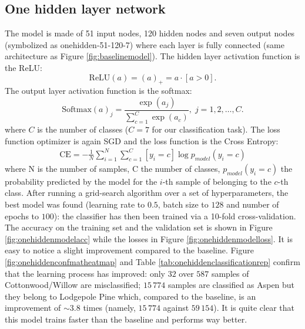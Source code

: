 \subsection{One hidden layer network}
\label{sec:onehidden}
The model is made of 51 input nodes, 120 hidden nodes and seven output nodes (symbolized as onehidden-51-120-7) where each layer is fully connected (same architecture as Figure \ref{fig:baselinemodel}). The hidden layer activation function is the ReLU:
\begin{equation}
\text{ReLU}(a) = (a)_+ = a\cdot[a>0].
\end{equation}
The output layer activation function is the softmax:
\begin{equation}
\text{Softmax}(a)_j = \frac{\exp(a_j)}{\sum_{c=1}^{C} \exp(a_c)}, \; j = 1,2,\dots,C.
\end{equation}
where $C$ is the number of classes ($C=7$ for our classification task). The loss function optimizer is again SGD and the loss function is the Cross Entropy:
\begin{equation}
\begin{aligned}
\text{CE} = - \frac{1}{N} \sum_{i=1}^{N}\sum_{c=1}^{C} [y_i = c] \log p_{model}(y_i = c)
\end{aligned}
\end{equation}
where N is the number of samples, C the number of classes, $p_{model}(y_i = c)$ the probability predicted by the model for the $i$-th sample of belonging to the $c$-th class. After running a grid-search algorithm over a set of hyperparameters, the best model was found (learning rate to $0.5$, batch size to $128$ and number of epochs to $100$): the classifier has then been trained via a 10-fold cross-validation. The accuracy on the training set and the validation set is shown in Figure \ref{fig:onehiddenmodelacc} while the losses in Figure \ref{fig:onehiddenmodelloss}. It is easy to notice a slight improvement compared to the baseline. Figure \ref{fig:onehiddenconfmatheatmap} and Table \ref{tab:onehiddenclassificationrep} confirm that the learning process has improved: only $32$ over $587$ samples of Cottonwood/Willow are misclassified; $15\,774$ samples are classified as Aspen but they belong to Lodgepole Pine which, compared to the baseline, is an improvement of $\sim3.8$ times (namely, $15\,774$ against $59\,154$). It is quite clear that this model trains faster than the baseline and performs way better.
